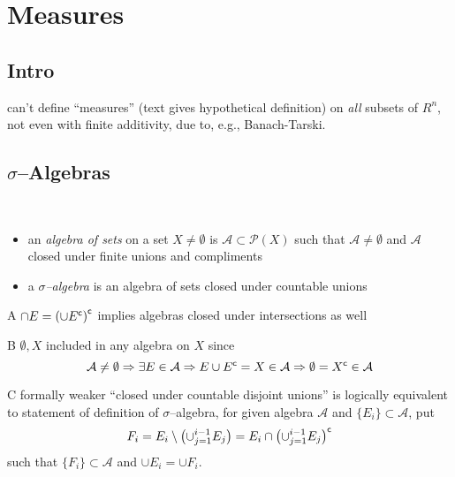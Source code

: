 \chapter{Measures}

\section{Intro}
can't define ``measures'' (text gives hypothetical definition)
on \emph{all} subsets of $R^n$, not even with finite additivity,
due to, e.g., Banach-Tarski.

\section{$\sigma$--Algebras}\label{sec:01:sigma-algebras}
\begin{defn}\
  \begin{itemize}
  \item an \emph{algebra of sets} on a set ${X\neq\emptyset}$
    is ${\mathcal{A}\subset\mathscr{P}(X)}$ such that
    ${\mathcal{A}\neq\emptyset}$ and $\mathcal{A}$
    closed under finite unions and compliments
  \item a \emph{$\sigma$--algebra} is an algebra of sets
    closed under countable unions
  \end{itemize}
\end{defn}

\begin{rem}{A}
  ${\cap E={\left(\cup {E}^{\mathsf{c}}\right)}^{\mathsf{c}}}$
  implies algebras closed under intersections as well
\end{rem}

\begin{rem}{B}
  $\emptyset, X$ included in any algebra on $X$ since
  \[
  \mathcal{A}\neq\emptyset \Rightarrow \exists E\in\mathcal{A}
  \Rightarrow E\cup{E}^{\mathsf{c}}=X\in\mathcal{A}
  \Rightarrow \emptyset={X}^{\mathsf{c}}\in\mathcal{A}
  \]
\end{rem}

\begin{rem}{C}\label{rem:01:sigma-algebra-equiv}
  formally weaker ``closed under countable disjoint unions''
  is logically equivalent to statement of definition of
  $\sigma$--algebra, for given algebra $\mathcal{A}$ and
  ${\{E_i\}\subset\mathcal{A}}$, put
  \[
  F_i=E_i\setminus\left(\cup_{j=1}^{i-1} E_j\right)=
  E_i\cap{\left(\cup_{j=1}^{i-1} E_j\right)}^{\mathsf{c}}
  \]
  such that
  ${\{F_i\}\subset\mathcal{A}}$ and
  ${\cup E_i = \cup F_i}$.
\end{rem}

